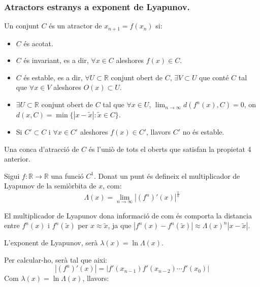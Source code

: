 \documentclass[../main.tex]{subfiles}
\begin{document}
\subsubsection{Atractors estranys a exponent de Lyapunov.}
\begin{definicio}
    Un conjunt $C$ és un atractor de $x_{n+1} = f(x_n)$ si:
    \begin{itemize}
        \item $C$ és acotat.
        \item $C$ és invariant, es a dir, $\forall x \in C$ aleshores $f(x) \in C$.
        \item $C$ és estable, es a dir, $\forall U \subset \mathbb{R}$ conjunt obert de $C$, $\exists V \subset U$ que conté $C$ tal que $\forall x \in V$ aleshores $O(x) \subset U$.
        \item $\exists U \subset \mathbb{R}$ conjunt obert de $C$ tal que $\forall x \in U$, $\lim_{n\to\infty} d(f^n(x), C) = 0$, on $d(x, C) = \min\{|x-\tilde{x}|: \tilde{x} \in C\}$.
        \item Si $C' \subset C$ i $\forall x \in C'$ aleshores $f(x) \in C'$, llavors $C'$ no és estable.
    \end{itemize}
\end{definicio}
\begin{definicio}
    Una conca d'atracció de $C$ és l'uniò de tots el oberts que satisfan la propietat 4 anterior.
\end{definicio}
\begin{definicio}
    Sigui $f: \mathbb{R} \rightarrow \mathbb{R}$ una funció $C^1$. Donat un punt és defineix el multiplicador de Lyapunov de la semiòrbita de $x$, com:
    \begin{displaymath}
        \Lambda(x) = \lim_{n\to\infty} {|(f^n)'(x)|}^\frac{1}{n}
    \end{displaymath}
\end{definicio}
El multiplicador de Lyapunov dona informació de com és comporta la distancia entre $f^n(x)$ i $f^n(\tilde{x})$ per $x \approx \tilde{x}$, ja que $|f^n(x) - f^n(\tilde{x})| \approx \Lambda(x)^n |x - \tilde{x}|$.
\begin{definicio}
    L'exponent de Lyapunov, serà $\lambda(x) = \ln \Lambda(x)$.
\end{definicio}
Per calcular-ho, serà tal que aixi:
\begin{displaymath}
    |(f^n)'(x)| = |f'(x_{n-1})f'(x_{n-2}) \cdots f'(x_0)|
\end{displaymath}
Com $\lambda(x) = \ln \Lambda(x)$, llavors:
\end{document}
